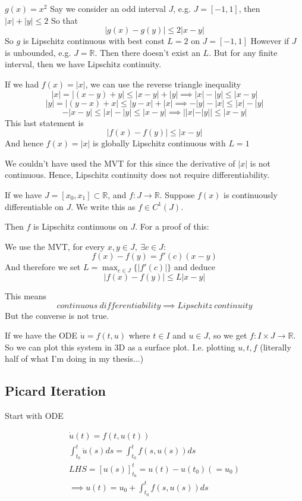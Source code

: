 \documentclass{X:/Documents/Coding/Latex/myassignment}
\begin{document}
$g(x) = x^2$
Say we consider an odd interval $J$, e.g. $J=[-1,1]$, then $|x| + |y| \leq 2$
So that
\[|g(x)-g(y)| \leq 2 |x-y|\]
So $g$ is Lipschitz continuous with best const $L=2$ on $J=[-1,1]$
However if $J$ is unbounded, e.g. $J =\mathbb{R}$. Then there doesn't exist an $L$.
But for any finite interval, then we have Lipschitz continuity.

If we had $f(x) = |x|$, we can use the reverse triangle inequality
\[|x| = |(x-y)+y| \leq |x-y| +|y| \implies |x|-|y| \leq |x-y|\]
\[|y| = |(y-x)+x| \leq |y-x| +|x| \implies -|y|-|x|\leq |x|-|y| \]
\[-|x-y| \leq |x|-|y| \leq |x-y| \implies ||x|-|y|| \leq |x-y|\]
This last statement is 
\[|f(x) - f(y)| \leq |x-y|\]
And hence $f(x) = |x|$ is globally Lipschitz continuous with $L=1$


We couldn't have used the MVT for this since the derivative of $|x|$ is not continuous. Hence, Lipschitz continuity does not require differentiability.

If we have $J=[x_0,x_1] \subset \mathbb{R}$, and $f : J\to \mathbb{R}$. Suppose $f(x)$ is continuously differentiable on $J$. We write this as $f \in C^1(J)$.

Then $f$ is Lipschitz continuous on $J$. For a proof of this:

We use the MVT, for every $x,y \in J, \ \exists c \in J:$
\[f(x) - f(y) = f'(c) (x-y)\]
And therefore we set $L = \max_{c\in J}\{|f'(c)|\}$  and deduce
\[|f(x) - f(y)| \leq L |x-y|\]

This means 
\[continuous\ differentiability \implies Lipschitz \ continuity\]
But the converse is not true.


If we have the ODE $\dot u = f(t,u)$ where $t \in I$ and $u \in J$, so we get $f:I\times J \to \mathbb{R}$. So we can plot this system in 3D as a surface plot. I.e. plotting $u,t,f$ (literally half of what I'm doing in my thesis...)

\subsection{Picard Iteration}
Start with ODE

\begin{align*}
    \dot u(t) = f(t,u(t))\\
    \int_{t_0}^t \dot u(s) ds = \int_{t_0}^t f(s,u(s))ds\\
    LHS =\left[u(s)\right]_{t_0}^{t} = u(t) - u(t_0)(=u_0)\\
    \implies u(t) = u_0 + \int_{t_0}^t f(s,u(s))ds
\end{align*}
\end{document}
